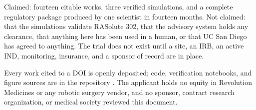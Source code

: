 \vspace{-0.2em}

Claimed: fourteen citable works, three verified simulations, and a complete
regulatory package produced by one scientist in fourteen months. Not claimed:
that the simulations validate RASolute 302, that the advisory system holds any
clearance, that anything here has been used in a human, or that UC San Diego has
agreed to anything. The trial does not exist until a site, an IRB, an active
IND, monitoring, insurance, and a sponsor of record are in place.

\vspace{-0.2em}

Every work cited to a DOI is openly deposited; code, verification notebooks, and
figure sources are in the repository \cite{repo2026}. The applicant holds no
equity in Revolution Medicines or any robotic surgery vendor, and no sponsor,
contract research organization, or medical society reviewed this document.

\vspace{0.1em}
\apprule{0.4pt}
\vspace{-0.1em}

\vspace{-0.35em}
\begin{apprefs}


\end{apprefs}
